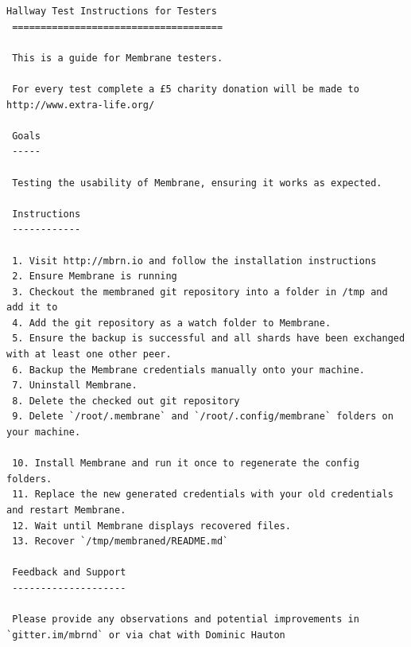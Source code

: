 \documentclass[11pt, a4paper, twoside]{report}
\begin{document}
\begin{lstlisting}[language=RsT, caption=Membrane Hallway Test Guide, label=lst:mbrntst]
 Hallway Test Instructions for Testers
 =====================================
 
 This is a guide for Membrane testers.
 
 For every test complete a £5 charity donation will be made to http://www.extra-life.org/
 
 Goals
 -----
 
 Testing the usability of Membrane, ensuring it works as expected.
 
 Instructions
 ------------
 
 1. Visit http://mbrn.io and follow the installation instructions
 2. Ensure Membrane is running
 3. Checkout the membraned git repository into a folder in /tmp and add it to
 4. Add the git repository as a watch folder to Membrane.
 5. Ensure the backup is successful and all shards have been exchanged with at least one other peer.
 6. Backup the Membrane credentials manually onto your machine.
 7. Uninstall Membrane.
 8. Delete the checked out git repository
 9. Delete `/root/.membrane` and `/root/.config/membrane` folders on your machine.
 
 10. Install Membrane and run it once to regenerate the config folders.
 11. Replace the new generated credentials with your old credentials and restart Membrane.
 12. Wait until Membrane displays recovered files.
 13. Recover `/tmp/membraned/README.md`
 
 Feedback and Support
 --------------------
 
 Please provide any observations and potential improvements in `gitter.im/mbrnd` or via chat with Dominic Hauton
\end{lstlisting}
\end{document}
